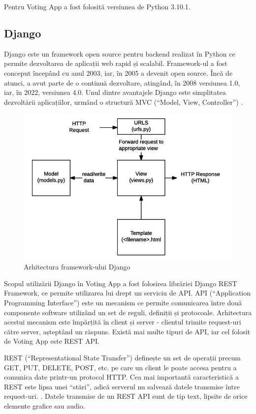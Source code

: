 Pentru Voting App a fost folosită versiunea de Python 3.10.1.

\subsection{Django}

Django este un framework open source pentru backend realizat în Python ce permite dezvoltarea de aplicații web rapid și scalabil. Framework-ul a fost conceput începând cu anul 2003, iar, în 2005 a devenit open source. Încă de atunci, a avut parte de o continuă dezvoltare, atingând, în 2008 versiunea 1.0, iar, în 2022, versiunea 4.0. Unul dintre avantajele Django este simplitatea dezvoltării aplicațiilor, urmând o structură MVC (\enquote{Model, View, Controller}) \cite{MVC_what_is}.

\begin{figure}[!h]
    \centering
    \includegraphics[width=130mm]{images/django.png}
    \caption{Arhitectura framework-ului Django}
\end{figure}

Scopul utilizării Django în Voting App a fost folosirea librăriei Django REST Framework, ce permite utilizarea lui drept un serviciu de API. API (\enquote{Application Programming Interface}) este un mecanism ce permite comunicarea între două componente software utilizând un set de reguli, definiții și protocoale. Arhitectura acestui mecanism este împărțită în client și server - clientul trimite request-uri către server, așteptând un răspuns. Există mai multe tipuri de API, iar cel folosit de Voting App este REST API.

REST (\enquote{Representational State Transfer}) definește un set de operații precum GET, PUT, DELETE, POST, etc. pe care un client le poate accesa pentru a comunica date printr-un protocol HTTP. Cea mai importantă caracteristică a REST este lipsa unei \enquote{stări}, adică serverul nu salvează datele transmise între request-uri. \cite{what_is_rest}. Datele transmise de un REST API sunt de tip text, lipsite de orice elemente grafice sau audio.

